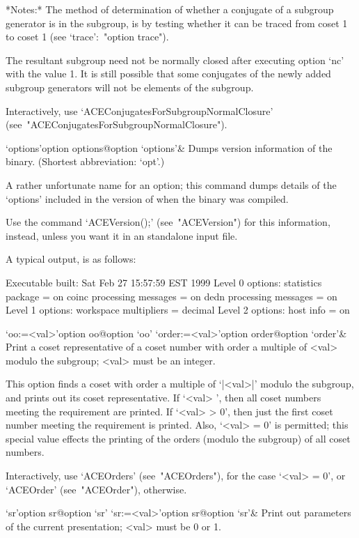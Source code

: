 *Notes:*
The method of determination of  whether  a  conjugate  of  a  subgroup
generator is in the subgroup, is by testing whether it can  be  traced
from coset 1 to coset 1  (see  `trace':~"option trace").

The resultant subgroup need not be  normally  closed  after  executing
option `nc'  with  the  value  1.  It  is  still  possible  that  some
conjugates of the newly added subgroup generators will not be elements
of the subgroup.

Interactively,       use       `ACEConjugatesForSubgroupNormalClosure'
(see~"ACEConjugatesForSubgroupNormalClosure").

\>`options'{option options}@{option `options'}&
Dumps version information of the {\ACE} binary.
(Shortest abbreviation: `opt'.)

A rather unfortunate name for an option; this command dumps details of
the \lq{}options' included in the version of {\ACE}  when  the  {\ACE}
binary was compiled.

Use  the   command   `ACEVersion();'   (see~"ACEVersion")   for   this
information, instead, unless you want it in an {\ACE} standalone input
file.

A typical output, is as follows:

\begintt
Executable built:
  Sat Feb 27 15:57:59 EST 1999
Level 0 options:
  statistics package = on
  coinc processing messages = on
  dedn processing messages = on
Level 1 options:
  workspace multipliers = decimal
Level 2 options:
  host info = on
\endtt

\>`oo:=<val>'{option oo}@{option `oo'}
\>`order:=<val>'{option order}@{option `order'}&
Print a coset representative of a coset number with order  a  multiple
of <val> modulo the subgroup; <val> must be an integer.

This option finds a coset with order a multiple  of  `|<val>|'  modulo
the subgroup, and prints out its coset representative.  If  `<val>  ', then all coset numbers meeting the  requirement  are  printed.  If
`<val> > 0', then just the first coset number meeting the  requirement
is printed. Also, `<val> = 0' is permitted; this special value effects
the printing of the orders (modulo the subgroup) of all coset numbers.

Interactively, use `ACEOrders' (see~"ACEOrders"), for the case  `<val>
= 0', or `ACEOrder' (see~"ACEOrder"), otherwise.

\>`sr'{option sr}@{option `sr'}
\>`sr:=<val>'{option sr}@{option `sr'}&
Print out parameters of the current presentation; <val> must be  0  or
1.

